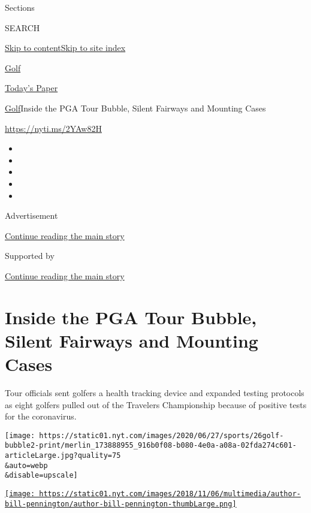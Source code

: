 Sections

SEARCH

\protect\hyperlink{site-content}{Skip to
content}\protect\hyperlink{site-index}{Skip to site index}

\href{https://www.nytimes.com/section/sports/golf}{Golf}

\href{https://myaccount.nytimes.com/auth/login?response_type=cookie\&client_id=vi}{}

\href{https://www.nytimes.com/section/todayspaper}{Today's Paper}

\href{/section/sports/golf}{Golf}\textbar{}Inside the PGA Tour Bubble,
Silent Fairways and Mounting Cases

\url{https://nyti.ms/2YAw82H}

\begin{itemize}
\item
\item
\item
\item
\item
\end{itemize}

Advertisement

\protect\hyperlink{after-top}{Continue reading the main story}

Supported by

\protect\hyperlink{after-sponsor}{Continue reading the main story}

\hypertarget{inside-the-pga-tour-bubble-silent-fairways-and-mounting-cases}{%
\section{Inside the PGA Tour Bubble, Silent Fairways and Mounting
Cases}\label{inside-the-pga-tour-bubble-silent-fairways-and-mounting-cases}}

Tour officials sent golfers a health tracking device and expanded
testing protocols as eight golfers pulled out of the Travelers
Championship because of positive tests for the coronavirus.

\texttt{[image: https://static01.nyt.com/images/2020/06/27/sports/26golf-bubble2-print/merlin\_173888955\_916b0f08-b080-4e0a-a08a-02fda274c601-articleLarge.jpg?quality=75\\\&auto=webp\\\&disable=upscale]}

\href{https://www.nytimes.com/by/bill-pennington}{\texttt{[image: https://static01.nyt.com/images/2018/11/06/multimedia/author-bill-pennington/author-bill-pennington-thumbLarge.png]}}

